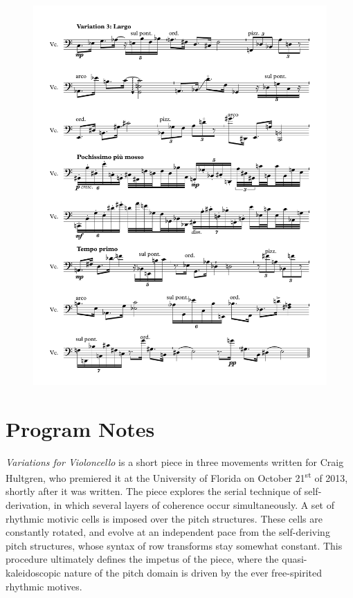 \begin{figure}[htbp]
    \centering
	\includegraphics[width=6.5in]{figures/Variations_3.pdf}
\end{figure}

\section*{Program Notes}

\emph{Variations for Violoncello} is a short piece in three movements written for Craig Hultgren, who premiered it at the University of Florida on October 21\textsuperscript{st} of 2013, shortly after it was written. The piece explores the serial technique of self-derivation, in which several layers of coherence occur simultaneously. A set of rhythmic motivic cells is imposed over the pitch structures. These cells are constantly rotated, and evolve at an independent pace from the self-deriving pitch structures, whose syntax of row transforms stay somewhat constant. This procedure ultimately defines the impetus of the piece, where the quasi-kaleidoscopic nature of the pitch domain is driven by the ever free-spirited rhythmic motives.

